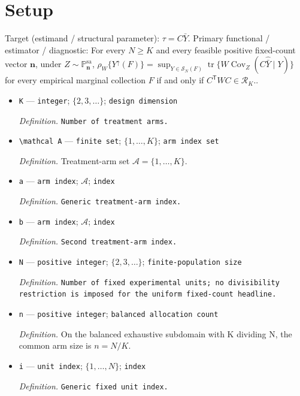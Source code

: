 \documentclass{article}
\begin{document}
\section{Setup}

Target (estimand / structural parameter): \(\tau=C\bar Y\).
Primary functional / estimator / diagnostic: For every \(N\geq K\) and every feasible positive fixed-count vector \(\mathbf n\), under \(Z\sim\mathbb P_{\mathbf n}^{\mathrm{sa}}\), \(\rho_W\{Y^{\uparrow}(F)\}=\sup_{Y\in\mathcal S_N(F)}\operatorname{tr}\{W\operatorname{Cov}_Z(C\widehat{\bar Y}\mid Y)\}\) for every empirical marginal collection \(F\) if and only if \(C^{\mathsf T}WC\in\mathcal R_K\)..
\begin{itemize}
  \item \texttt{K} --- \texttt{integer}; \(\{2,3,\ldots\}\); \texttt{design dimension}
  \par\smallskip\noindent\emph{Definition.} \texttt{Number of treatment arms.}
  \item \texttt{\textbackslash{}\allowbreak{}mathcal A} --- \texttt{finite set}; \(\{1,\ldots,K\}\); \texttt{arm index set}
  \par\smallskip\noindent\emph{Definition.} Treatment-arm set \(\mathcal A=\{1,\ldots,K\}\).
  \item \texttt{a} --- \texttt{arm index}; \(\mathcal A\); \texttt{index}
  \par\smallskip\noindent\emph{Definition.} \texttt{Generic treatment-\allowbreak{}arm index.}
  \item \texttt{b} --- \texttt{arm index}; \(\mathcal A\); \texttt{index}
  \par\smallskip\noindent\emph{Definition.} \texttt{Second treatment-\allowbreak{}arm index.}
  \item \texttt{N} --- \texttt{positive integer}; \(\{2,3,\ldots\}\); \texttt{finite-\allowbreak{}population size}
  \par\smallskip\noindent\emph{Definition.} \texttt{Number of fixed experimental units;\allowbreak{} no divisibility restriction is imposed for the uniform fixed-\allowbreak{}count headline.}
  \item \texttt{n} --- \texttt{positive integer}; \texttt{balanced allocation count}
  \par\smallskip\noindent\emph{Definition.} On the balanced exhaustive subdomain with K dividing N, the common arm size is \(n=N/K\).
  \item \texttt{i} --- \texttt{unit index}; \(\{1,\ldots,N\}\); \texttt{index}
  \par\smallskip\noindent\emph{Definition.} \texttt{Generic fixed unit index.}

\end{itemize}
\end{document}
